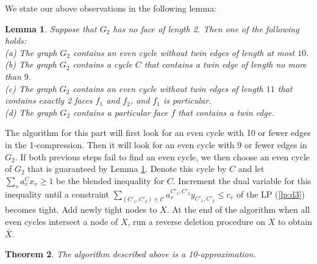 \documentclass{article}
\newcommand{\C}{\ensuremath{\mathcal{C}}}
\newcommand{\0}{\mathbb{0}}
\newcommand{\1}{\mathbb{1}}
\newtheorem{theorem}{Theorem}[section]
\newtheorem{lemma}[theorem]{Lemma}
\begin{document}
We state our above observations in the following lemma:
\begin{lemma}\label{improved ec}
  Suppose that $G_2$ has no face of length 2. Then one of the following holds: \\
  (a) The graph $G_2$ contains an even cycle without
twin edges of length at most $10$. \\
(b) The graph $G_2$ contains a cycle $C$ that contains a twin edge of length no more than $9$. \\
(c) The graph $G_2$ contains an even cycle without twin edges of length $11$ that contains exactly 2 faces $f_1$ and $f_2$, and $f_1$ is particular. \\  %
(d) The graph $G_2$ contains a particular face $f$ that contains a twin edge.  %
\end{lemma} 
The algorithm for this part will first look for an even cycle with 10 or fewer edges in the 1-compression. Then it will look for an even cycle with 9 or fewer edges in $G_2$. If both previous steps fail to find an even cycle, we then choose an even cycle of $G_2$ that is guaranteed by Lemma \ref{improved ec}. Denote this cycle by $C$ and let $\sum_v a_v^C x_v \geq 1 $ be the blended inequality for $C$. Increment the dual variable for this inequality until a  constraint $\sum_{(C'_1,C'_2) \in \C} a^{C'_1,C'_2}_vy_{C'_1,C'_2} \leq c_v $ of the LP (\ref{lp:d3}) becomes tight. Add newly tight nodes to $X$.  At the end of the algorithm when all even cycles intersect a node of $X$, run a reverse deletion procedure on $X$ to obtain $\bar{X}$. 
\begin{theorem}
  The algorithm described above is a 10-approximation.
\end{theorem}
\end{document}
